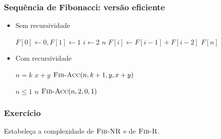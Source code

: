 \documentclass[handout]{beamer}
\begin{document}
\begin{frame}
\frametitle{Sequência de Fibonacci: versão eficiente}

\begin{itemize}
\item Sem recursividade
\begin{codebox}
\li $F[0] \gets 0, F[1] \gets 1$
\li \For $i \gets 2$ \To $n$
\li \Do $F[i] \gets F[i-1] + F[i-2]$
    \End
\li \Return $F[n]$
\end{codebox}
\item Com recursividade
\begin{codebox}
\li \If $n = k$  \Return $x+y$
\li \Else \Return $\textnormal{\scshape Fib-Acc}(n, k+1, y, x+y)$
\end{codebox}
\begin{codebox}
\li \If $n \le 1$  \Return $n$
\li \Else \Return $\textnormal{\scshape Fib-Acc}(n, 2, 0, 1)$
\end{codebox}
\end{itemize}

\end{frame}

\begin{frame}
\frametitle{Exercício}

Estabeleça a complexidade de $\textnormal{\scshape Fib-NR}$ e de $\textnormal{\scshape Fib-R}$.

\end{frame}
\end{document}
